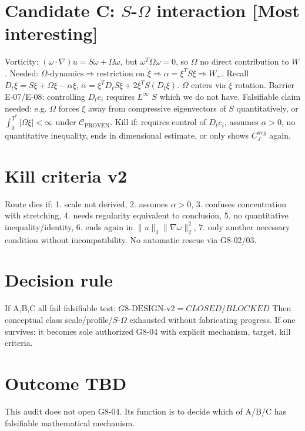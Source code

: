 \documentclass[11pt]{article}
\begin{document}
\section{Candidate C: $S$-$\Omega$ interaction [Most interesting]}
Vorticity: $(\omega\cdot\nabla)u=S\omega+\Omega\omega$, but $\omega^T\Omega\omega=0$, so $\Omega$ no direct contribution to $W$.
Needed: $\boxed{\Omega\text{-dynamics}\Rightarrow\text{restriction on }\dot\xi\Rightarrow\alpha=\xi^TS\xi\Rightarrow W_+}$.
Recall $D_t\xi=S\xi+\Omega\xi-\alpha\xi$, $\dot\alpha=\xi^TD_tS\xi+2\xi^TS(D_t\xi)$.
$\Omega$ enters via $\dot\xi$ rotation.
Barrier E-07/E-08: controlling $D_te_i$ requires $L^\infty$ $S$ which we do not have.
Falsifiable claim needed: e.g. $\Omega$ forces $\xi$ away from compressive eigenvectors of $S$ quantitatively, or $\int_0^{T^*}|\Omega\xi|<\infty$ under $\mathcal C_{\mathrm{PROVEN}}$.
Kill if: requires control of $D_te_i$, assumes $\alpha>0$, no quantitative inequality, ends in dimensional estimate, or only shows $C_J^{neg}$ again.

\section{Kill criteria v2}
Route dies if:
1. scale not derived,
2. assumes $\alpha>0$,
3. confuses concentration with stretching,
4. needs regularity equivalent to conclusion,
5. no quantitative inequality/identity,
6. ends again in $\|u\|_3\|\nabla\omega\|_2^2$,
7. only another necessary condition without incompatibility.
No automatic rescue via G8-02/03.

\section{Decision rule}
If A,B,C all fail falsifiable test:
$\boxed{G8\text{-DESIGN-v2}=CLOSED/BLOCKED}$
Then conceptual class scale/profile/$S$-$\Omega$ exhausted without fabricating progress.
If one survives: it becomes sole authorized G8-04 with explicit mechanism, target, kill criteria.

\section{Outcome TBD}
This audit does not open G8-04. Its function is to decide which of A/B/C has falsifiable mathematical mechanism.
\end{document}

